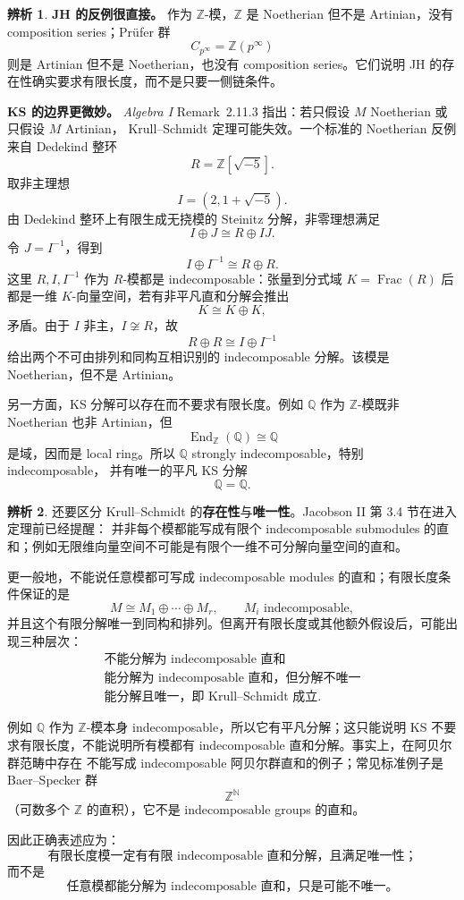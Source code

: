 \documentclass[a4paper]{ctexart}
\theoremstyle{definition}
\theoremstyle{analysis}
\newtheorem{remark}{辨析}[section]
\theoremstyle{plain}
\begin{document}
\begin{remark}
\label{rem:ks-chain-condition-boundary}
\textbf{JH 的反例很直接。} 作为 \(\mathbb Z\)-模，\(\mathbb Z\) 是 Noetherian 但不是 Artinian，没有 composition series；Prüfer 群
\[
  C_{p^\infty}=\mathbb Z(p^\infty)
\]
则是 Artinian 但不是 Noetherian，也没有 composition series。它们说明 JH 的存在性确实要求有限长度，而不是只要一侧链条件。

\textbf{KS 的边界更微妙。} \textit{Algebra I} Remark~2.11.3 指出：若只假设 \(M\) Noetherian 或只假设 \(M\) Artinian，
Krull--Schmidt 定理可能失效。一个标准的 Noetherian 反例来自 Dedekind 整环
\[
  R=\mathbb Z[\sqrt{-5}].
\]
取非主理想
\[
  I=(2,1+\sqrt{-5}).
\]
由 Dedekind 整环上有限生成无挠模的 Steinitz 分解，非零理想满足
\[
  I\oplus J\cong R\oplus IJ.
\]
令 \(J=I^{-1}\)，得到
\[
  I\oplus I^{-1}\cong R\oplus R.
\]
这里 \(R,I,I^{-1}\) 作为 \(R\)-模都是 indecomposable：张量到分式域
\(K=\operatorname{Frac}(R)\) 后都是一维 \(K\)-向量空间，若有非平凡直和分解会推出
\[
  K\cong K\oplus K,
\]
矛盾。由于 \(I\) 非主，\(I\not\cong R\)，故
\[
  R\oplus R
  \cong
  I\oplus I^{-1}
\]
给出两个不可由排列和同构互相识别的 indecomposable 分解。该模是 Noetherian，但不是 Artinian。

另一方面，KS 分解可以存在而不要求有限长度。例如 \(\mathbb Q\) 作为 \(\mathbb Z\)-模既非 Noetherian
也非 Artinian，但
\[
  \operatorname{End}_{\mathbb Z}(\mathbb Q)\cong \mathbb Q
\]
是域，因而是 local ring。所以 \(\mathbb Q\) strongly indecomposable，特别 indecomposable，
并有唯一的平凡 KS 分解
\[
  \mathbb Q=\mathbb Q.
\]
\end{remark}

\begin{remark}
\label{rem:indecomposable-decomposition-not-automatic}
还要区分 Krull--Schmidt 的\textbf{存在性}与\textbf{唯一性}。Jacobson II 第 3.4 节在进入定理前已经提醒：
并非每个模都能写成有限个 indecomposable submodules 的直和；例如无限维向量空间不可能是有限个一维不可分解向量空间的直和。

更一般地，不能说任意模都可写成
indecomposable modules 的直和；有限长度条件保证的是
\[
  M\cong M_1\oplus\cdots\oplus M_r,
  \qquad M_i\text{ indecomposable},
\]
并且这个有限分解唯一到同构和排列。但离开有限长度或其他额外假设后，可能出现三种层次：
\[
\begin{array}{c}
  \text{不能分解为 indecomposable 直和}\\[2mm]
  \text{能分解为 indecomposable 直和，但分解不唯一}\\[2mm]
  \text{能分解且唯一，即 Krull--Schmidt 成立}.
\end{array}
\]

例如 \(\mathbb Q\) 作为 \(\mathbb Z\)-模本身 indecomposable，所以它有平凡分解；这只能说明
KS 不要求有限长度，不能说明所有模都有 indecomposable 直和分解。事实上，在阿贝尔群范畴中存在
不能写成 indecomposable 阿贝尔群直和的例子；常见标准例子是 Baer--Specker 群
\[
  \mathbb Z^{\mathbb N}
\]
（可数多个 \(\mathbb Z\) 的直积），它不是 indecomposable groups 的直和。

因此正确表述应为：
\[
  \text{有限长度模一定有有限 indecomposable 直和分解，且满足唯一性；}
\]
而不是
\[
  \text{任意模都能分解为 indecomposable 直和，只是可能不唯一。}
\]
\end{remark}
\end{document}
